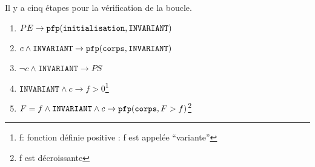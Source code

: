 Il y a cinq étapes pour la vérification de la boucle.
\begin{enumerate}
	\item $PE \rightarrow \pfp(\texttt{initialisation}, \texttt{INVARIANT})$
	\item $c \wedge \texttt{INVARIANT} \rightarrow \pfp (\texttt{corps}, \texttt{INVARIANT})$\label{etape2boucle}
	\item $\neg c \wedge \texttt{INVARIANT} \rightarrow PS$ \label{etape3boucle}
	\item $ \texttt{INVARIANT} \wedge c \rightarrow f > 0$\footnote{f: fonction définie positive : f est appelée ``variante''}
	\item $F = f \wedge \texttt{INVARIANT} \wedge c \rightarrow \pfp (\texttt{corps}, F > f)$\footnote{f est décroissante}
\end{enumerate}

